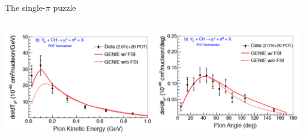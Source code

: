\begin{frame}{The single-$\pi$ puzzle}
\begin{columns}
\begin{column}{0.50\textwidth}
\begin{itemize}
{        }
      \end{itemize}
      \begin{center}
         \includegraphics[width=0.98\textwidth]{./images/nuint/ccpi/minerva_CCpi0_2x}\\
      \end{center}
    \end{column}
  \end{columns}

\end{frame}


